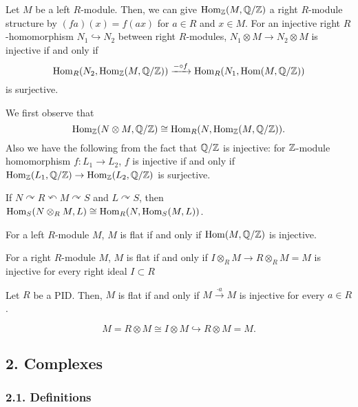 \documentclass{../../../small}
\begin{document}
\begin{prop*}[1.8.3]
Let $M$ be a left $R$-module.
Then, we can give $\operatorname{Hom}_{\mathbb{Z}}(M,\mathbb{Q}/\mathbb{Z})$ a right $R$-module structure by $(fa)(x)=f(ax)$ for $a\in R$ and $x\in M$.
For an injective right $R$-homomorphism $N_1\hookrightarrow N_2$ between right $R$-modules, $N_1\otimes M\to N_2\otimes M$ is injective if and only if
\[\operatorname{Hom}_R(N_2,\operatorname{Hom}_{\mathbb{Z}}(M,\mathbb{Q}/\mathbb{Z}))\xrightarrow{-\circ f}\operatorname{Hom}_R(N_1,\operatorname{Hom}(M,\mathbb{Q}/\mathbb{Z}))\]
is surjective.
\end{prop*}
\begin{pf}
We first observe that
\[\operatorname{Hom}_{\mathbb{Z}}(N\otimes M,\mathbb{Q}/\mathbb{Z})\cong\operatorname{Hom}_R(N,\operatorname{Hom}_{\mathbb{Z}}(M,\mathbb{Q}/\mathbb{Z})).\]
Also we have the following from the fact that $\mathbb{Q}/\mathbb{Z}$ is injective: for $\mathbb{Z}$-module homomorphism $f:L_1\to L_2$, $f$ is injective if and only if $\operatorname{Hom}_{\mathbb{Z}}(L_1,\mathbb{Q}/\mathbb{Z})\to\operatorname{Hom}_{\mathbb{Z}}(L_2,\mathbb{Q}/\mathbb{Z})$ is surjective.
\end{pf}
\begin{rmk*}
If $N\curvearrowright R\curvearrowleft M\curvearrowright S$ and $L\curvearrowright S$, then $\operatorname{Hom}_S(N\otimes_RM,L)\cong\operatorname{Hom}_R(N,\operatorname{Hom}_S(M,L))$.
\end{rmk*}

\begin{cor*}[1.8.4]
For a left $R$-module $M$, $M$ is flat if and only if $\operatorname{Hom}(M,\mathbb{Q}/\mathbb{Z})$ is injective.
\end{cor*}

\begin{cor*}[1.8.5]
For a right $R$-module $M$, $M$ is flat if and only if $I\otimes_RM\to R\otimes_RM=M$ is injective for every right ideal $I\subset R$
\end{cor*}

\begin{cor*}[1.8.6]
Let $R$ be a PID.
Then, $M$ is flat if and only if $M\xrightarrow{\cdot a}M$ is injective for every $a\in R$.
\end{cor*}
\begin{pf}
\[M=R\otimes M\cong I\otimes M\hookrightarrow R\otimes M=M.\]
\end{pf}


\subsection*{2. Complexes}

\subsubsection*{2.1. Definitions}
\end{document}
